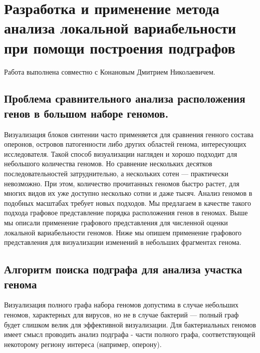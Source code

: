 \section{Разработка и применение метода анализа локальной вариабельности при помощи построения подграфов}
Работа выполнена совместно с Конановым Дмитрием Николаевичем.\\


\subsection{Проблема сравнительного анализа расположения генов в большом наборе геномов.}

Визуализация блоков синтении часто применяется для сравнения генного состава оперонов, островов патогенности либо других областей генома, интересующих исследователя. Такой способ визуализации нагляден и хорошо подходит для небольшого количества геномов. Но сравнение нескольких десятков последовательностей затруднительно, а нескольких сотен --- практически невозможно. При этом, количество прочитанных геномов быстро растет, для многих видов их уже доступно несколько сотни и даже тысяч. Анализ геномов в подобных масштабах требует новых подходов. Мы предлагаем в качестве такого подхода графовое представление порядка расположения генов в геномах. Выше мы описали применение графового представления для численной оценки локальной вариабельности геномов. Ниже мы опишем применение графового представления для визуализации изменений в небольших фрагментах генома. 

\subsection{Алгоритм поиска подграфа для анализа участка генома}

Визуализация полного графа набора геномов допустима в случае небольших геномов, характерных для вирусов, но не в случае бактерий --- полный граф будет слишком велик для эффективной визуализации. Для бактериальных геномов имеет смысл проводить анализ подграфа - части полного графа, соответствующей некоторому региону интереса (например, оперону).

